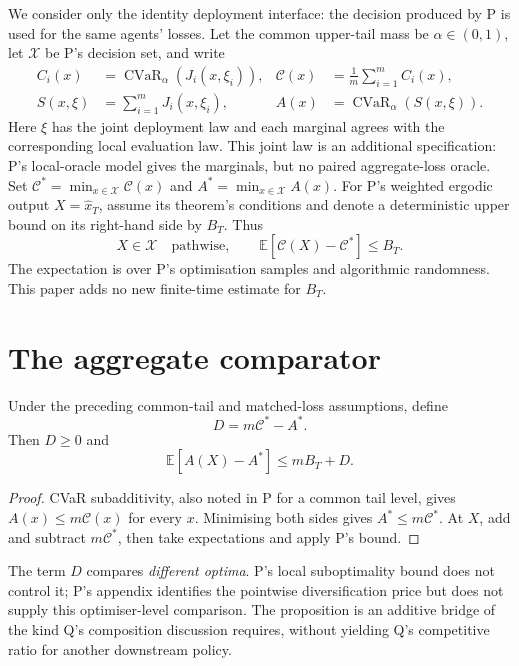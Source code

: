 \documentclass{article}
\begin{document}
We consider only the identity deployment interface: the decision
produced by P is used for the same agents' losses.  Let the common upper-tail mass
be \(\alpha\in(0,1)\), let \(\mathcal X\) be P's decision set, and
write
\[
\begin{aligned}
C_i(x)&=\operatorname{CVaR}_{\alpha}(J_i(x,\xi_i)),
&\mathcal C(x)&=\frac1m\sum_{i=1}^m C_i(x),\\
S(x,\xi)&=\sum_{i=1}^m J_i(x,\xi_i),
&A(x)&=\operatorname{CVaR}_{\alpha}(S(x,\xi)).
\end{aligned}
\]
Here \(\xi\) has the joint deployment law and each marginal agrees
with the corresponding local evaluation law.  This joint law is an
additional specification: P's local-oracle model gives the marginals,
but no paired aggregate-loss oracle.  Set
\(\mathcal C^*=\min_{x\in\mathcal X}\mathcal C(x)\) and
\(A^*=\min_{x\in\mathcal X}A(x)\).  For P's weighted ergodic output
\(X=\hat x_T\), assume its theorem's conditions and denote a
deterministic upper bound on its right-hand side by \(B_T\).  Thus
\[
X\in\mathcal X\quad\text{pathwise},\qquad
\mathbb E[\mathcal C(X)-\mathcal C^*]\le B_T.
\]
The expectation is over P's optimisation samples and algorithmic
randomness.  This paper adds no new finite-time estimate for \(B_T\).

\section{The aggregate comparator}

\begin{proposition}\label{prop:bridge}
Under the preceding common-tail and matched-loss assumptions, define
\[
D=m\mathcal C^*-A^*.
\]
Then \(D\ge0\) and
\[
\mathbb E[A(X)-A^*]\le mB_T+D.
\]
\end{proposition}

\begin{proof}
CVaR subadditivity, also noted in P for a common tail level, gives
\(A(x)\le m\mathcal C(x)\) for every \(x\).  Minimising both sides
gives \(A^*\le m\mathcal C^*\).  At \(X\), add and subtract
\(m\mathcal C^*\), then take expectations and apply P's bound.
\end{proof}

The term \(D\) compares \emph{different optima}.  P's local
suboptimality bound does not control it; P's appendix identifies the
pointwise diversification price but does not supply this optimiser-level
comparison.  The proposition is an additive bridge of the kind Q's
composition discussion requires, without yielding Q's competitive
ratio for another downstream policy.
\end{document}
